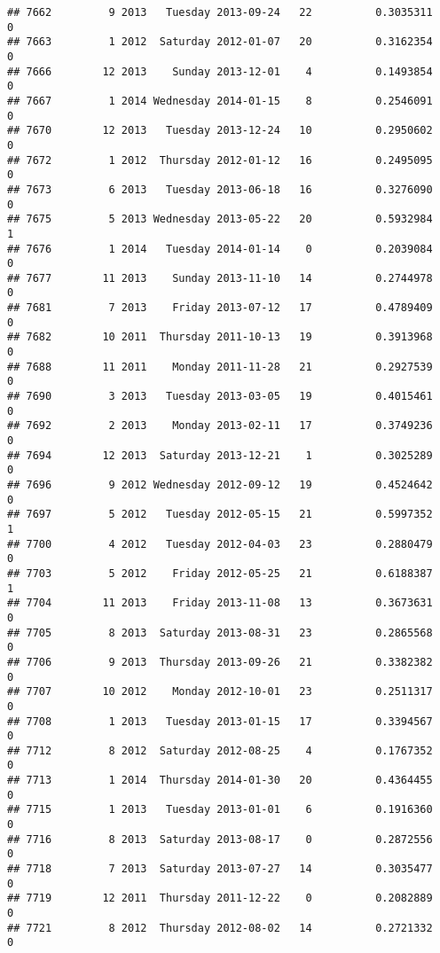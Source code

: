 \documentclass[
]{article}
\begin{document}
\begin{verbatim}
## 7662         9 2013   Tuesday 2013-09-24   22          0.3035311             0
## 7663         1 2012  Saturday 2012-01-07   20          0.3162354             0
## 7666        12 2013    Sunday 2013-12-01    4          0.1493854             0
## 7667         1 2014 Wednesday 2014-01-15    8          0.2546091             0
## 7670        12 2013   Tuesday 2013-12-24   10          0.2950602             0
## 7672         1 2012  Thursday 2012-01-12   16          0.2495095             0
## 7673         6 2013   Tuesday 2013-06-18   16          0.3276090             0
## 7675         5 2013 Wednesday 2013-05-22   20          0.5932984             1
## 7676         1 2014   Tuesday 2014-01-14    0          0.2039084             0
## 7677        11 2013    Sunday 2013-11-10   14          0.2744978             0
## 7681         7 2013    Friday 2013-07-12   17          0.4789409             0
## 7682        10 2011  Thursday 2011-10-13   19          0.3913968             0
## 7688        11 2011    Monday 2011-11-28   21          0.2927539             0
## 7690         3 2013   Tuesday 2013-03-05   19          0.4015461             0
## 7692         2 2013    Monday 2013-02-11   17          0.3749236             0
## 7694        12 2013  Saturday 2013-12-21    1          0.3025289             0
## 7696         9 2012 Wednesday 2012-09-12   19          0.4524642             0
## 7697         5 2012   Tuesday 2012-05-15   21          0.5997352             1
## 7700         4 2012   Tuesday 2012-04-03   23          0.2880479             0
## 7703         5 2012    Friday 2012-05-25   21          0.6188387             1
## 7704        11 2013    Friday 2013-11-08   13          0.3673631             0
## 7705         8 2013  Saturday 2013-08-31   23          0.2865568             0
## 7706         9 2013  Thursday 2013-09-26   21          0.3382382             0
## 7707        10 2012    Monday 2012-10-01   23          0.2511317             0
## 7708         1 2013   Tuesday 2013-01-15   17          0.3394567             0
## 7712         8 2012  Saturday 2012-08-25    4          0.1767352             0
## 7713         1 2014  Thursday 2014-01-30   20          0.4364455             0
## 7715         1 2013   Tuesday 2013-01-01    6          0.1916360             0
## 7716         8 2013  Saturday 2013-08-17    0          0.2872556             0
## 7718         7 2013  Saturday 2013-07-27   14          0.3035477             0
## 7719        12 2011  Thursday 2011-12-22    0          0.2082889             0
## 7721         8 2012  Thursday 2012-08-02   14          0.2721332             0

\end{verbatim}
\end{document}
